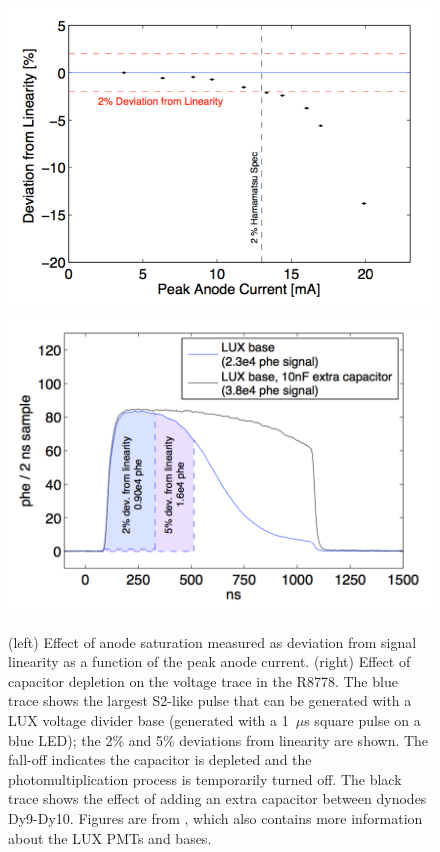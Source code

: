 \begin{figure}[htbp]
\begin{center}
\includegraphics[width=\halffig]{figures/etrains/anode_saturation.png}
\includegraphics[width=\halffig]{figures/etrains/capacitor_depletion.png}
\caption{(left) Effect of anode saturation measured as deviation from signal linearity as a function of the peak anode current. (right) Effect of capacitor depletion on the voltage trace in the R8778. The blue trace shows the largest S2-like pulse that can be generated with a \acs{LUX} voltage divider base (generated with a 1~$\mu$s square pulse on a blue LED); the 2\% and 5\% deviations from linearity are shown. The fall-off indicates the capacitor is depleted and the photomultiplication process is temporarily turned off. The black trace shows the effect of adding an extra capacitor between dynodes Dy9-Dy10. Figures are from \cite{Faham2014a}, which also contains more information about the \acs{LUX} \acs{PMT}s and bases. }
\label{fig:pmt_saturation_plots}
\end{center}
\end{figure}


